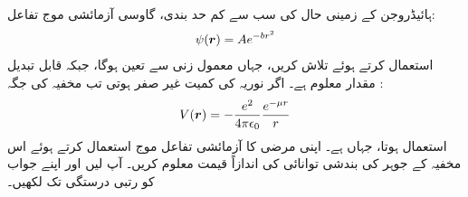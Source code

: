 ہائیڈروجن کے زمینی حال کی سب سے کم حد بندی، گاوسی آزمائشی موج تفاعل:
\begin{align*}
\psi({{\boldsymbol{r}}})=Ae^{-br^{2}} 
\end{align*}
 استعمال کرتے ہوئے تلاش کریں، جہاں  معمول زنی سے تعین ہوگا، جبکہ  قابل تبدیل مقدار معلوم ہے۔  
اگر نوریہ کی کمیت غیر صفر  ہوتی تب مخفیہ کی جگہ : 
\begin{align}
V({{\boldsymbol{r}}})=-\frac{e^{2}}{4\pi\epsilon_{0}}\frac{e^{-\mu r}}{r} 
\end{align}
 استعمال ہوتا، جہاں  ہے۔ اپنی مرضی کا آزمائشی تفاعل موج استعمال کرتے ہوئے اس مخفیہ کے  جوہر کی بندشی توانائی کی اندازاً قیمت معلوم کریں۔ آپ  لیں اور اپنے جواب کو  رتبی درستگی تک لکھیں۔
 
